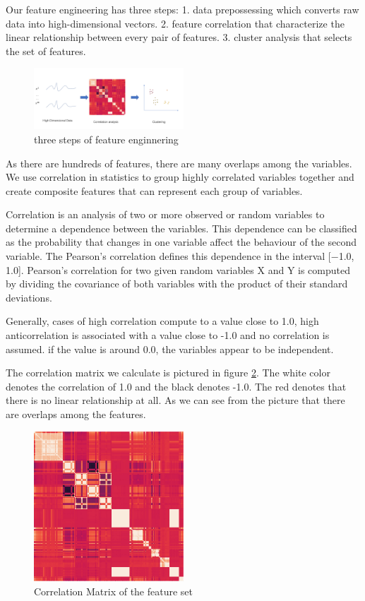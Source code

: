 \documentclass[5p]{elsarticle}
\begin{document}
Our feature engineering has three steps: 1. data prepossessing which converts raw data into high-dimensional vectors. 2. feature correlation that characterize the linear relationship between every pair of features. 3. cluster analysis that selects the set of features.

\begin{figure}[h]
    \centering
    \includegraphics[width=0.5\textwidth]{feature_engineering.png}
    \caption{three steps of feature enginnering}
    \label{fig:Correlation_matrix}
\end{figure}

As there are hundreds of features, there are many overlaps among the variables. We use correlation in statistics to group highly correlated variables together and create composite features that can represent each group of variables.

Correlation is an analysis of two or more observed or random variables to determine a dependence between the variables. This dependence can be classified as the probability that changes in one variable affect the behaviour of the second variable. The Pearson’s correlation defines this dependence in the interval [−1.0, 1.0]. Pearson’s correlation for two given random variables X and Y is computed by dividing the covariance of both variables with the product of their standard deviations.

Generally, cases of high correlation compute to a value close to 1.0, high anticorrelation is associated with a value close to -1.0 and no correlation is assumed. if the value is around 0.0, the variables appear to be independent. 

The correlation matrix we calculate is pictured in figure \ref{fig:Correlation_matrix}. The white color denotes the correlation of 1.0 and the black denotes -1.0. The red denotes that there is no linear relationship at all. As we can see from the picture that there are overlaps among the features.

\begin{figure}[h]
    \centering
    \includegraphics[width=0.5\textwidth]{Correlation_Matrix.png}
    \caption{Correlation Matrix of the feature set}
    \label{fig:Correlation_matrix}
\end{figure}
\end{document}
